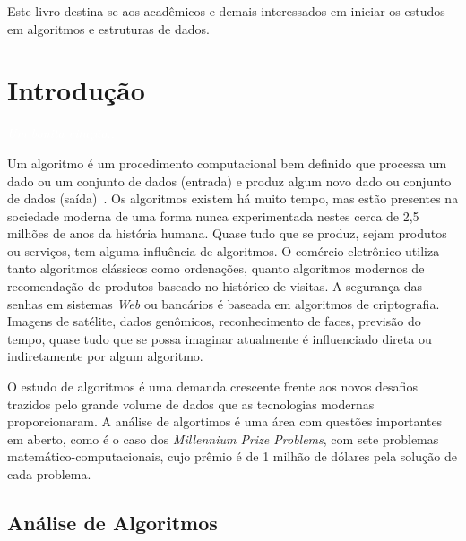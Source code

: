 \documentclass[11pt,fleqn]{book} %
\begin{document}

Este livro destina-se aos acadêmicos e demais interessados em iniciar os estudos em algoritmos e estruturas de dados.

\chapter{Introdução}\label{introducao}
\vspace{6em}
\begin{flushright}
	\textit{\textcolor{white}{Um bonita citação...}}
\end{flushright}
\vspace{12em}

Um algoritmo é um procedimento computacional bem definido que processa um dado ou um conjunto de dados (entrada) e produz algum novo dado ou conjunto de dados (saída)~\cite{cormen2009}.
Os algoritmos existem há muito tempo, mas estão presentes na sociedade moderna de uma forma nunca experimentada nestes cerca de 2,5 milhões de anos da história humana.
Quase tudo que se produz, sejam produtos ou serviços, tem alguma influência de algoritmos.
O comércio eletrônico utiliza tanto algoritmos clássicos como ordenações, quanto algoritmos modernos de recomendação de produtos baseado no histórico de visitas.
A segurança das senhas em sistemas \textit{Web} ou bancários é baseada em algoritmos de criptografia.
Imagens de satélite, dados genômicos, reconhecimento de faces, previsão do tempo, quase tudo que se possa imaginar atualmente é influenciado direta ou indiretamente por algum algoritmo.

O estudo de algoritmos é uma demanda crescente frente aos novos desafios trazidos pelo grande volume de dados que as tecnologias modernas proporcionaram.
A análise de algortimos é uma área com questões importantes em aberto, como é o caso dos \textit{Millennium Prize Problems}, com sete problemas matemático-computacionais, cujo prêmio é de 1 milhão de dólares pela solução de cada problema.

\section{Análise de Algoritmos}\label{sec_analise}
\end{document}

